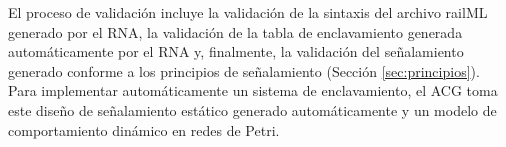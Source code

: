     El proceso de validación incluye la validación de la sintaxis del archivo railML generado por el RNA, la validación de la tabla de enclavamiento generada automáticamente por el RNA y, finalmente, la validación del señalamiento generado conforme a los principios de señalamiento (Sección \ref{sec:principios}). Para implementar automáticamente un sistema de enclavamiento, el ACG toma este diseño de señalamiento estático generado automáticamente y un modelo de comportamiento dinámico en redes de Petri. 



%
